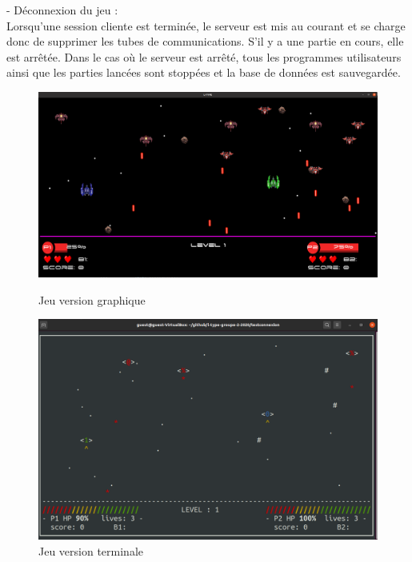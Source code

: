 \documentclass[a4paper,12pt]{article}
\begin{document}
- Déconnexion du jeu : \\
Lorsqu'une session cliente est terminée, le serveur est mis au courant et se charge donc de supprimer les tubes de communications. S'il y a une partie en cours, elle est arrêtée. 
Dans le cas où le serveur est arrêté, tous les programmes utilisateurs ainsi que les parties lancées sont stoppées et la base de données est sauvegardée. \\
\begin{figure}
\centering
\includegraphics[scale=0.21]{SRD/images/ingameGui.png}
\caption{Jeu version graphique}

\includegraphics[scale=0.34]{SRD/images/ingameTerm.png}
\caption{Jeu version terminale}
\end{figure}
\end{document}
